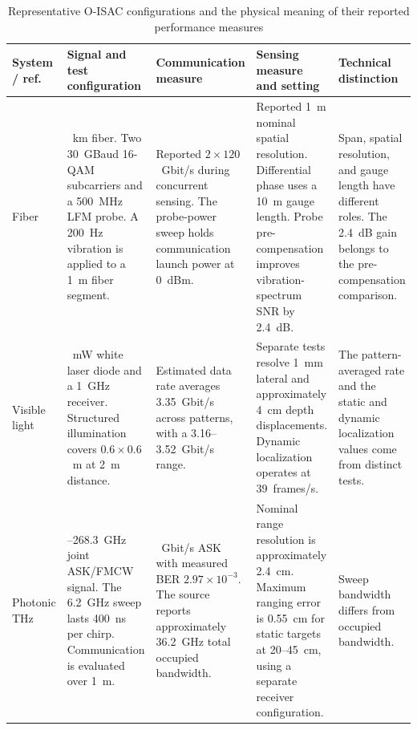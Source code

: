 \begin{table}[!t]
\caption{Representative O-ISAC configurations and the physical meaning of
their reported performance measures}
\label{tab:section2_quantitative_examples}
\centering
\begingroup
\footnotesize
\setlength{\tabcolsep}{4pt}
\renewcommand{\arraystretch}{1.15}
\begin{tabularx}{\textwidth}{@{}
>{\raggedright\arraybackslash}p{}
>{\raggedright\arraybackslash}p{}
>{\raggedright\arraybackslash}p{}
>{\raggedright\arraybackslash}p{}
>{\raggedright\arraybackslash}X@{}}
\toprule
\textbf{System / ref.} &
\textbf{Signal and test configuration} &
\textbf{Communication measure} &
\textbf{Sensing measure and setting} &
\textbf{Technical distinction} \\
\midrule
Fiber\newline\cite{OISAC_SCR00057} &
40~km fiber. Two 30~GBaud 16-QAM subcarriers and a 500~MHz LFM probe.
A 200~Hz vibration is applied to a 1~m fiber segment. &
Reported $2\times120$~Gbit/s during concurrent sensing.
The probe-power sweep holds communication launch power at 0~dBm. &
Reported 1~m nominal spatial resolution.
Differential phase uses a 10~m gauge length.
Probe pre-compensation improves vibration-spectrum SNR by 2.4~dB. &
Span, spatial resolution, and gauge length have different roles.
The 2.4~dB gain belongs to the pre-compensation comparison. \\
\addlinespace[4pt]
Visible light\newline\cite{OISAC_SCR00196} &
225~mW white laser diode and a 1~GHz receiver.
Structured illumination covers $0.6\times0.6$~m at 2~m distance. &
Estimated data rate averages 3.35~Gbit/s across patterns,
with a 3.16--3.52~Gbit/s range. &
Separate tests resolve 1~mm lateral and approximately 4~cm depth
displacements. Dynamic localization operates at 39~frames/s. &
The pattern-averaged rate and the static and dynamic localization values
come from distinct tests. \\
\addlinespace[4pt]
Photonic THz\newline\cite{OISAC_SCR00083} &
262.1--268.3~GHz joint ASK/FMCW signal.
The 6.2~GHz sweep lasts 400~ns per chirp.
Communication is evaluated over 1~m. &
15~Gbit/s ASK with measured BER $2.97\times10^{-3}$.
The source reports approximately 36.2~GHz total occupied bandwidth. &
Nominal range resolution is approximately 2.4~cm.
Maximum ranging error is 0.55~cm for static targets at 20--45~cm,
using a separate receiver configuration. &
Sweep bandwidth differs from occupied bandwidth.

\end{tabularx}
\end{table}
